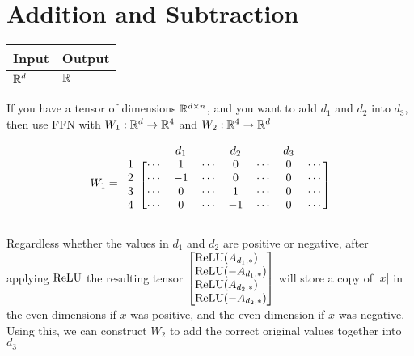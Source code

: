 \section{Addition and Subtraction}\label{sec:ffnn_addition}

    \begin{tabular}{|p{1.5cm}|p{1.5cm}|}
        \hline
        \rowcolor{orange!20} %
        \textbf{Input} & \textbf{Output} \\
        \hline
        $\mathbb{R}^d$ & $\mathbb{R}$ \\
        \hline
    \end{tabular}

    If you have a tensor of dimensions $\mathbb{R}^{d\times n}$, and you want to add
    $d_1$ and $d_2$ into $d_3$, then use FFN with $W_1:\mathbb{R}^d\to \mathbb{R}^4$ and $W_2:\mathbb{R}^4\to \mathbb{R}^d$

    \begin{equation*}
        W_1=
        \begin{blockarray}{cccccccc}
            & & d_1 & & d_2 & & d_3 & \\
            \begin{block}{c[ccccccc]}
                    1& \cdots & 1 & \cdots & 0 & \cdots & 0 & \cdots \\
                    2& \cdots & -1 & \cdots & 0 & \cdots & 0 & \cdots \\
                    3& \cdots & 0 & \cdots & 1 & \cdots & 0 & \cdots \\
                    4& \cdots & 0 & \cdots & -1 & \cdots & 0 & \cdots \\
            \end{block}
        \end{blockarray}
    \end{equation*}

    Regardless whether the values in $d_1$ and $d_2$ are positive or negative, after applying $\text{ReLU}$ the resulting tensor $\begin{bmatrix}
        \ReLU(A_{d_1,*})\phantom- \\
        \ReLU(-A_{d_1,*})\\
        \ReLU(A_{d_2,*})\phantom- \\
        \ReLU(-A_{d_2,*})\\
    \end{bmatrix}$ will store a copy of $|x|$ in the even dimensions if $x$ was positive, and the even dimension if $x$ was negative. Using this, we can construct $W_2$ to add the correct original values together into $d_3$

